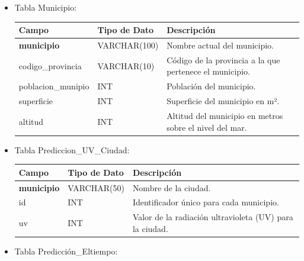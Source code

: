 \documentclass[12pt, a4paper]{article}
\begin{document}
\begin{itemize}

\item Tabla Municipio:

\begin{center}
\begin{tabular}{|p{}|p{}|p{}|}
    \hline
    \textbf{Campo} & \textbf{Tipo de Dato} & \textbf{Descripción} \\
    \hline
    \textbf{municipio} & VARCHAR(100) & Nombre actual del municipio. \\
    codigo\_provincia & VARCHAR(10) & Código de la provincia a la que pertenece el municipio. \\
    poblacion\_munipio & INT & Población del municipio. \\
    superficie & INT & Superficie del municipio en m². \\
    altitud & INT & Altitud del municipio en metros sobre el nivel del mar. \\
    \hline
\end{tabular}
\end{center}

\newpage
\item Tabla Prediccion\_UV\_Ciudad:

\begin{center}
\begin{tabular}{|p{}|p{}|p{}|}
    \hline
    \textbf{Campo} & \textbf{Tipo de Dato} & \textbf{Descripción} \\
    \hline
    \textbf{municipio} & VARCHAR(50) & Nombre de la ciudad. \\
    id & INT & Identificador único para cada municipio. \\
    uv & INT & Valor de la radiación ultravioleta (UV) para la ciudad. \\
    \hline
\end{tabular}
\end{center}

\item Tabla Predicción\_Eltiempo:


\end{itemize}
\end{document}

